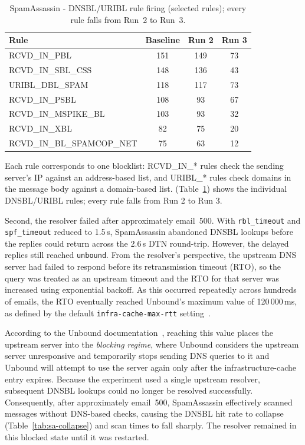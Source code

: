 \begin{table}[H]\centering
\small
\begin{tabular}{@{}lccc@{}}
\toprule
Rule & Baseline & Run 2 & Run 3 \\
\midrule
RCVD\_IN\_PBL          & 151 & 149 & 73 \\
RCVD\_IN\_SBL\_CSS     & 148 & 136 & 43 \\
URIBL\_DBL\_SPAM       & 118 & 117 & 73 \\
RCVD\_IN\_PSBL         & 108 & 93  & 67 \\
RCVD\_IN\_MSPIKE\_BL   & 103 & 93  & 32 \\
RCVD\_IN\_XBL          & 82  & 75  & 20 \\
RCVD\_IN\_BL\_SPAMCOP\_NET & 75 & 63 & 12 \\
\bottomrule
\end{tabular}
\caption{SpamAssassin - DNSBL/URIBL rule firing (selected rules); every rule falls from Run~2
to Run~3.}
\label{tab:sa-rules}
\end{table}

Each rule corresponds to one blocklist: RCVD\_IN\_* rules check the sending server's IP against an address-based list, and URIBL\_* rules check domains in the message body against a domain-based list. (Table~\ref{tab:sa-rules}) shows the individual DNSBL/URIBL rules; every rule falls from Run 2 to Run 3.

Second, the resolver failed after approximately email~500. With
\texttt{rbl\_timeout} and \texttt{spf\_timeout} reduced to 1.5\,s,
SpamAssassin abandoned DNSBL lookups before the replies could return across the
2.6\,s DTN round-trip. However, the delayed replies still reached
\texttt{unbound}. From the resolver's perspective, the upstream DNS server had
failed to respond before its retransmission timeout (RTO), so the query was
treated as an upstream timeout and the RTO for that server was increased using
exponential backoff. As this occurred repeatedly across hundreds of emails, the
RTO eventually reached Unbound's maximum value of 120\,000\,ms, as defined by
the default \texttt{infra-cache-max-rtt} setting~\cite{archwiki_unbound}.

According to the Unbound documentation~\cite{unbound_timeout}, reaching this value places the upstream server into the \emph{blocking regime},  where Unbound considers the upstream server unresponsive and temporarily stops sending DNS queries to it and Unbound will attempt to use the server again only after the infrastructure-cache entry expires. Because the experiment used a single upstream resolver, subsequent DNSBL lookups could no longer be resolved successfully. Consequently, after approximately email~500, SpamAssassin effectively scanned messages without DNS-based checks, causing the DNSBL hit rate to collapse (Table~\ref{tab:sa-collapse}) and scan times to fall sharply. The resolver remained in this blocked state until it was restarted.

